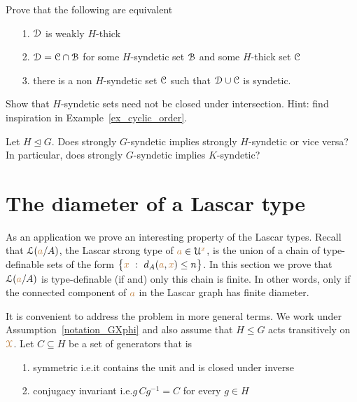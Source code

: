 
\begin{exercise}
  Prove that the following are equivalent
  \begin{itemize}
    \item[1.] $\EuScript D$ is weakly $H$-thick
    \item[2.] $\EuScript D=\EuScript C\cap\EuScript B$ for some $H$-syndetic set $\EuScript B$ and some $H$-thick set $\EuScript C$
    \item [3.] there is a non $H$-syndetic set $\EuScript C$ such that $\EuScript D\cup\EuScript C$ is syndetic.
  \end{itemize}
\end{exercise}

\begin{exercise}
  Show that $H$-syndetic sets need not be closed under intersection.
  Hint: find inspiration in Example~\ref{ex_cyclic_order}.
\end{exercise}

\begin{question}
  Let $H\trianglelefteq G$.
  Does strongly $G$-syndetic implies strongly $H$-syndetic or vice versa?
  In particular, does strongly $G$-syndetic implies $K$-syndetic?
\end{question}

\section{The diameter of a Lascar type}\label{newelski}

As an application we prove an interesting property of the Lascar types.
Recall that $\EuScript L({\color{brown} a}/A)$, the Lascar strong type of ${\color{brown} a}\in\EuScript U^{\color{brown} x}$, is the union of a chain of type-definable sets of the form $\big\{{\color{brown} x}\ :\ d_A({\color{brown} a},{\color{brown} x})\le n\big\}$.
In this section we prove that $\EuScript L({\color{brown} a}/A)$ is type-definable (if and) only this chain is finite.
In other words, only if the connected component of ${\color{brown} a}$ in the Lascar graph has finite diameter.

It is convenient to address the problem in more general terms.
We work under Assumption~\ref{notation_GXphi} and also assume that $H\le G$ acts transitively on ${\color{brown}\EuScript X}$.
Let $C\subseteq H$ be a set of generators that is
\begin{itemize}
  \item[1.] symmetric i.e.\@ it contains the unit and is closed under inverse
  \item[2.] conjugacy invariant i.e.\@ $g\,Cg^{-1}=C$ for every $g\in H$
\end{itemize}

